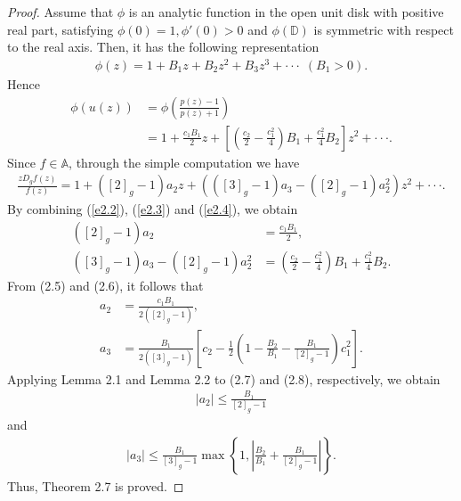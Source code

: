\documentclass[10pt,a4paper]{amsart}
\begin{document}
\begin{proof}
Assume that $\phi$ is an analytic function in the open unit disk with positive real part, satisfying $\phi(0)=1, \phi'(0)>0$ and $\phi(\mathbb{D})$ is symmetric with respect to the real axis. Then, it has the following representation
\begin{align}
\phi(z)=1+B_{1}z+B_{2}z^{2}+B_{3}z^{3}+\cdot\cdot\cdot\ \ (B_{1}>0)\nonumber.
\end{align}
Hence
\begin{align}\nonumber\label{e2.3}
\phi(u(z))&=\phi\left(\frac{p(z) - 1}{p(z) + 1}\right)\\
&=1+\frac{c_{1}B_{1}}{2}z+\left[\left(\frac{c_{2}}{2}-\frac{c_{1}^{2}}{4}\right)B_{1}+\frac{c_{1}^{2}}{4}B_{2}\right]z^{2}+\cdot\cdot\cdot.
\end{align}
Since $f\in \mathbb{A} $, through the simple computation we have
\begin{align}\label{e2.4}
\frac{zD_{g}f(z)}{f(z)}=1+\left([2]_{g}-1\right)a_{2}z+\left(([3]_{g}-1)a_{3}-([2]_{g}-1)a_{2}^{2}\right)z^{2}+\cdot\cdot\cdot.
\end{align}
By combining (\ref{e2.2}), (\ref{e2.3}) and (\ref{e2.4}), we obtain
\begin{align}
\left([2]_{g}-1\right)a_{2} &= \frac{c_{1}B_{1}}{2}, \\
([3]_{g}-1)a_{3}-([2]_{g}-1)a_{2}^{2} &= \left(\frac{c_{2}}{2}-\frac{c_{1}^{2}}{4}\right)B_{1}+\frac{c_{1}^{2}}{4}B_{2}.
\end{align}
From (2.5) and (2.6), it follows that
\begin{align}
a_{2} &= \frac{c_1B_{1}}{2([2]_{g}-1)}, \\
a_{3} &= \frac{B_{1}}{2([3]_{g}-1)}\left[c_{2}-\frac{1}{2}\left(1-\frac{B_{2}}{B_{1}}-\frac{B_{1}}{[2]_{g}-1}\right)c_{1}^{2}\right].
\end{align}
Applying Lemma 2.1 and Lemma 2.2 to (2.7) and (2.8), respectively, we obtain
\begin{align}
\mid a_{2}\mid \leq \frac{B_{1}}{[2]_{g}-1}\nonumber
\end{align}
and
\begin{align}\nonumber
\mid a_{3}\mid \leq\frac{B_{1}}{[3]_{g}-1}\max\left\{1, \left|\frac{B_{2}}{B_{1}}+\frac{B_{1}}{[2]_{g}-1}\right|\right\}.\nonumber
\end{align}
Thus, Theorem 2.7 is proved.
\end{proof}
\end{document}

